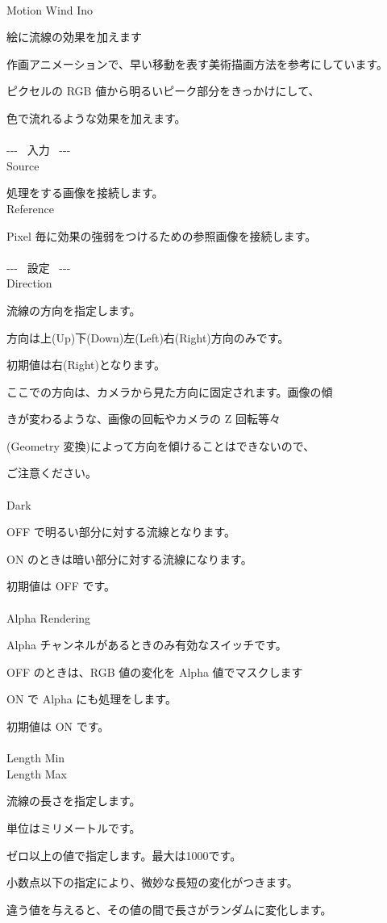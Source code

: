 \documentclass[a4paper,12pt]{article}
\begin{document}
\thispagestyle{empty}

\Large
\noindent \\
Motion Wind Ino\medskip
\par
\normalsize
絵に流線の効果を加えます\\
\par
作画アニメーションで、早い移動を表す美術描画方法を参考にしています。\par
ピクセルの RGB 値から明るいピーク部分をきっかけにして、\par
色で流れるような効果を加えます。\\
\\
-{-}- \ 入力 \ -{-}-\\
Source\par
処理をする画像を接続します。\\
Reference\par
Pixel 毎に効果の強弱をつけるための参照画像を接続します。\\
\\
-{-}- \ 設定 \ -{-}-\\
Direction\par
流線の方向を指定します。\par
方向は上(Up)下(Down)左(Left)右(Right)方向のみです。\par
初期値は右(Right)となります。\par
ここでの方向は、カメラから見た方向に固定されます。画像の傾\par
きが変わるような、画像の回転やカメラの Z 回転等々\par
(Geometry 変換)によって方向を傾けることはできないので、\par
ご注意ください。\\
\\
Dark\par
OFF で明るい部分に対する流線となります。\par
ON のときは暗い部分に対する流線になります。\par
初期値は OFF です。\\
\\
Alpha Rendering\par
Alpha チャンネルがあるときのみ有効なスイッチです。\par
OFF のときは、RGB 値の変化を Alpha 値でマスクします\par
ON で Alpha にも処理をします。\par
初期値は ON です。\\
\\
Length Min\\
Length Max\par
流線の長さを指定します。\par
単位はミリメートルです。\par
ゼロ以上の値で指定します。最大は1000です。\par
小数点以下の指定により、微妙な長短の変化がつきます。\par
違う値を与えると、その値の間で長さがランダムに変化します。
\end{document}
